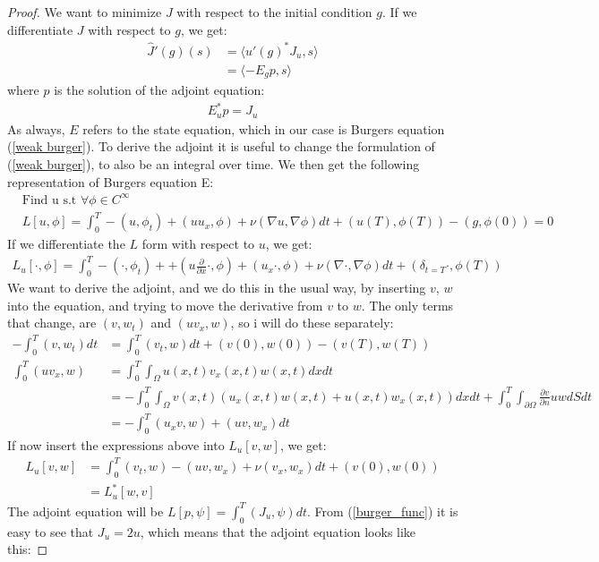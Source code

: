 \documentclass[11pt,a4paper]{article}
\begin{document}
\begin{proof}
We want to minimize $J$ with respect to the initial condition $g$. If we differentiate $J$ with respect to $g$, we get:
\begin{align*}
\hat{J}'(g)(s) &= \langle u'(g)^*J_u,s \rangle \\
&= \langle -E_gp,s \rangle
\end{align*}
where $p$ is the solution of the adjoint equation:
\begin{align*}
E_u^*p = J_u
\end{align*}
As always, $E$ refers to the state equation, which in our case is Burgers equation (\ref{weak burger}). To derive the adjoint it is useful to change the formulation of (\ref{weak burger}), to also be an integral over time. We then get the following representation of Burgers equation E: 
\begin{align}
&\text{Find u s.t $\forall \phi \in C^{\infty}$} \\
&L[u,\phi]=\int_0^T-(u,\phi_t) + (uu_x,\phi) + \nu( \nabla u, \nabla\phi)dt + (u(T),\phi(T))-(g,\phi(0)) =0 \label{int_burger}
\end{align}
If we differentiate the $L$ form with respect to $u$, we get:
\begin{align*}
L_u[\cdot,\phi] = \int_0^T-(\cdot,\phi_t) + +(u\frac{\partial}{\partial x}\cdot,\phi)+(u_x\cdot,\phi) + \nu( \nabla \cdot, \nabla\phi)dt+ (\delta_{t=T}\cdot,\phi(T))
\end{align*}
We want to derive the adjoint, and we do this in the usual way, by inserting $v$, $w$ into the equation, and trying to move the derivative from $v$ to $w$. The only terms that change, are $(v,w_t)$ and $(uv_x,w)$, so i will do these separately:
\begin{align*}
-\int_0^T(v,w_t)dt &= \int_0^T (v_t,w)dt + (v(0),w(0))-(v(T),w(T))\\
\int_0^T(uv_x,w) &= \int_0^T\int_{\Omega} u(x,t)v_x(x,t)w(x,t)dxdt \\
&=-\int_0^T\int_{\Omega} v(x,t)(u_x(x,t)w(x,t) + u(x,t)w_x(x,t))dxdt + \int_0^T \int_{\partial\Omega}\frac{\partial v}{\partial n}uwdSdt \\
&=-\int_0^T(u_xv,w)+(uv,w_x)dt
\end{align*}
If now insert the expressions above into $L_u[v,w]$, we get:
\begin{align*}
L_u[v,w] &= \int_0^T(v_t,w) -(uv,w_x) +\nu(v_x,w_x)dt +(v(0),w(0)) \\
&=L_u^*[w,v]
\end{align*}
The adjoint equation will be $L[p,\psi]=\int_0^T(J_u,\psi)dt$. From (\ref{burger_func}) it is easy to see that $J_u=2u$, which means that the adjoint equation looks like this:

\end{proof}
\end{document}
